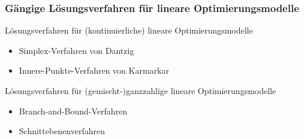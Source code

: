 \begin{frame}
 \frametitle{Gängige Lösungsverfahren für lineare Optimierungsmodelle}
 \begin{block}{Lösungsverfahren für (kontinuierliche) lineare Optimierungsmodelle}
  \begin{itemize}
    \item Simplex-Verfahren von Dantzig
    \item Innere-Punkte-Verfahren von Karmarkar 
  \end{itemize}
 \end{block}
 \begin{block}{Lösungsverfahren für (gemischt-)ganzzahlige lineare Optimierungsmodelle}
  \begin{itemize}
    \item Branch-and-Bound-Verfahren
    \item Schnittebenenverfahren 
  \end{itemize}
 \end{block}
\end{frame}




